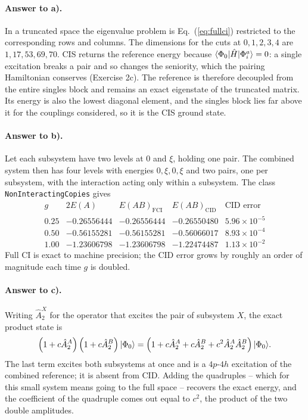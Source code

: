 \paragraph{Answer to a).}
In a truncated space the eigenvalue problem is Eq.~(\ref{eq:fullci})
restricted to the corresponding rows and columns.  The dimensions for the cuts
at $0,1,2,3,4$ are $1,17,53,69,70$.  CIS returns the reference energy because
$\langle \Phi_0 | \hat{H} | \Phi_i^a \rangle=0$: a single excitation breaks a pair and
so changes the seniority, which the pairing Hamiltonian conserves
(Exercise 2c).  The reference is therefore decoupled from the
entire singles block and remains an exact eigenstate of the truncated matrix.
Its energy is also the lowest diagonal element, and the singles block lies far
above it for the couplings considered, so it is the CIS ground state.

\paragraph{Answer to b).}
Let each subsystem have two levels at $0$ and $\xi$, holding one pair.  The
combined system then has four levels with energies $0,\xi,0,\xi$ and two
pairs, one per subsystem, with the interaction acting only within a
subsystem.  The class \texttt{NonInteractingCopies} gives
\begin{equation}
\begin{array}{rllll}
g & 2E(A) & E(AB)_{\mathrm{FCI}} & E(AB)_{\mathrm{CID}}
  & \text{CID error}\\[2pt]
0.25 & -0.26556444 & -0.26556444 & -0.26550480 & 5.96\times10^{-5}\\
0.50 & -0.56155281 & -0.56155281 & -0.56066017 & 8.93\times10^{-4}\\
1.00 & -1.23606798 & -1.23606798 & -1.22474487 & 1.13\times10^{-2}
\end{array}
\label{eq:5-exc1}
\end{equation}
Full CI is exact to machine precision; the CID error grows by roughly an order
of magnitude each time $g$ is doubled.

\paragraph{Answer to c).}
Writing $\hat{A}_2^X$ for the operator that excites the pair of subsystem $X$,
the exact product state is
\begin{equation}
  \left(1+c\hat{A}_2^A\right)\left(1+c\hat{A}_2^B\right)\vert \Phi_0 \rangle
  = \left(1 + c\hat{A}_2^A + c\hat{A}_2^B
    + c^2\hat{A}_2^A\hat{A}_2^B\right)\vert \Phi_0 \rangle.
  \label{eq:5-exc2}
\end{equation}
The last term excites both subsystems at once and is a $4p$-$4h$ excitation of
the combined reference; it is absent from CID.  Adding the quadruples -- which
for this small system means going to the full space -- recovers the exact
energy, and the coefficient of the quadruple comes out equal to $c^2$, the
product of the two double amplitudes.

